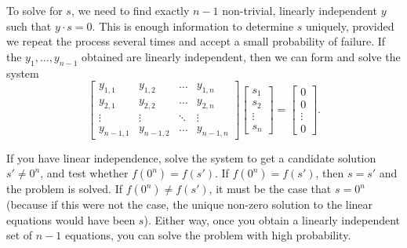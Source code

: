 To solve for $s$, we need to find exactly $n-1$ non-trivial, linearly independent $y$ such that $y \cdot s = 0$. This is enough information to determine $s$ uniquely, provided we repeat the process several times and accept a small probability of failure. If the $y_1, \ldots, y_{n-1}$ obtained are linearly independent, then we can form and solve the system
\[
\begin{bmatrix} 
y_{1,1} & y_{1,2}  & \ldots & y_{1,n} \\ 
y_{2,1} & y_{2,2} & \ldots & y_{2,n} \\ 
\vdots & \vdots & \ddots & \vdots \\ 
y_{n-1,1} & y_{n-1,2} & \ldots & y_{n-1,n} 
\end{bmatrix}
\begin{bmatrix} 
s_1 \\ s_2 \\ \vdots \\ s_n 
\end{bmatrix}
=
\begin{bmatrix}
0 \\ 0 \\ \vdots \\ 0
\end{bmatrix}.
\]

If you have linear independence, solve the system to get a candidate solution $s' \neq 0^n$, and test whether $f(0^n) = f(s')$. If $f(0^n) = f(s')$, then $s = s'$ and the problem is solved. If $f(0^n) \neq f(s')$, it must be the case that $s = 0^n$ (because if this were not the case, the unique non-zero solution to the linear equations would have been $s$). Either way, once you obtain a linearly independent set of $n-1$ equations, you can solve the problem with high probability.

